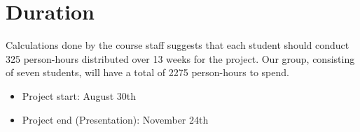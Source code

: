 \section{Duration}
Calculations done by the course staff suggests that each student should conduct 325 person-hours distributed over 13 weeks for the project. Our group, consisting of seven students, will have a total of 2275 person-hours to spend.\\
\begin {itemize}
	\item Project start: August 30th
	\item Project end (Presentation): November 24th
\end{itemize}


